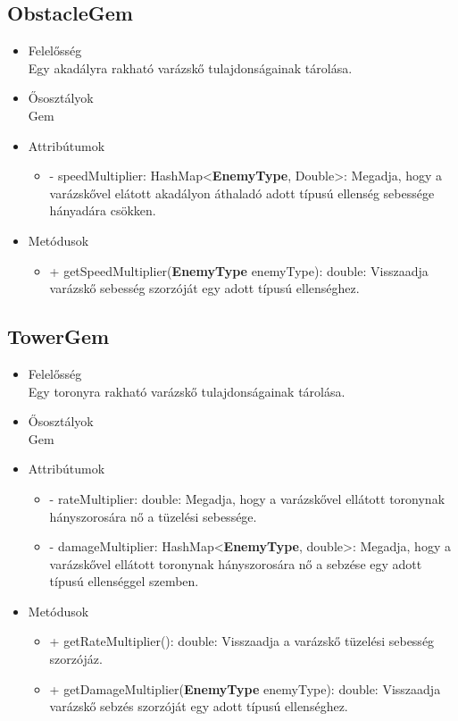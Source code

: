 \subsection{ObstacleGem}
\begin{itemize}
\item Felelősség\\
Egy akadályra rakható varázskő tulajdonságainak tárolása.
\item Ősosztályok\\
Gem
\item Attribútumok
	\begin{itemize}
		\item - speedMultiplier: HashMap<\textbf{EnemyType}, Double>: Megadja, hogy a varázskővel elátott akadályon áthaladó adott típusú ellenség sebessége hányadára csökken.
	\end{itemize}
\item Metódusok
	\begin{itemize}
		\item + getSpeedMultiplier(\textbf{EnemyType} enemyType): double: Visszaadja varázskő sebesség szorzóját egy adott típusú ellenséghez.
	\end{itemize}
\end{itemize}

\subsection{TowerGem}
\begin{itemize}
\item Felelősség\\
Egy toronyra rakható varázskő tulajdonságainak tárolása.
\item Ősosztályok\\
Gem
\item Attribútumok
	\begin{itemize}
		\item - rateMultiplier: double: Megadja, hogy a varázskővel ellátott toronynak hányszorosára nő a tüzelési sebessége.
		\item - damageMultiplier: HashMap<\textbf{EnemyType}, double>: Megadja, hogy a varázskővel ellátott toronynak hányszorosára nő a sebzése egy adott típusú ellenséggel szemben.
	\end{itemize}
\item Metódusok
	\begin{itemize}
		\item + getRateMultiplier(): double: Visszaadja a varázskő tüzelési sebesség szorzójáz.
		\item + getDamageMultiplier(\textbf{EnemyType} enemyType): double: Visszaadja varázskő sebzés szorzóját egy adott típusú ellenséghez.
	\end{itemize}
\end{itemize}

